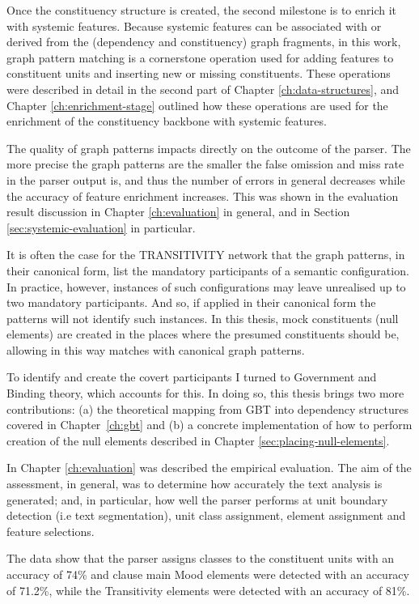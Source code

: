     Once the constituency structure is created, the second milestone is to enrich it with systemic features. Because systemic features can be associated with or derived from the (dependency and constituency) graph fragments, in this work, graph pattern matching is a cornerstone operation used for adding features to constituent units and inserting new or missing constituents. These operations were described in detail in the second part of Chapter \ref{ch:data-structures}, and Chapter \ref{ch:enrichment-stage} outlined how these operations are used for the enrichment of the constituency backbone with systemic features.

    The quality of graph patterns impacts directly on the outcome of the parser. The more precise the graph patterns are the smaller the false omission and miss rate in the parser output is, and thus the number of errors in general decreases while the accuracy of feature enrichment increases. This was shown in the evaluation result discussion in Chapter \ref{ch:evaluation} in general, and in Section \ref{sec:systemic-evaluation} in particular. 
    
    It is often the case for the TRANSITIVITY network that the graph patterns, in their canonical form, list the mandatory participants of a semantic configuration. In practice, however, instances of such configurations may leave unrealised up to two mandatory participants. And so, if applied in their canonical form the patterns will not identify such instances. In this thesis, mock constituents (null elements) are created in the places where the presumed constituents should be, allowing in this way matches with canonical graph patterns. 
    
    To identify and create the covert participants I turned to Government and Binding theory, which accounts for this. In doing so, this thesis brings two more contributions: (a) the theoretical mapping from GBT into dependency structures covered in \mbox{Chapter \ref{ch:gbt}} and (b) a concrete implementation of how to perform creation of the null elements described in Chapter \ref{sec:placing-null-elements}.

    In Chapter \ref{ch:evaluation} was described the empirical evaluation. The aim of the assessment, in general, was to determine how accurately the text analysis is generated; and, in particular, how well the parser performs at unit boundary detection (i.e text segmentation), unit class assignment, element assignment and feature selections. 
    
    The data show that the parser assigns classes to the constituent units with an accuracy of 74\% and clause main Mood elements were detected with an accuracy of 71.2\%, while the Transitivity elements were detected with an accuracy of 81\%. 
    

